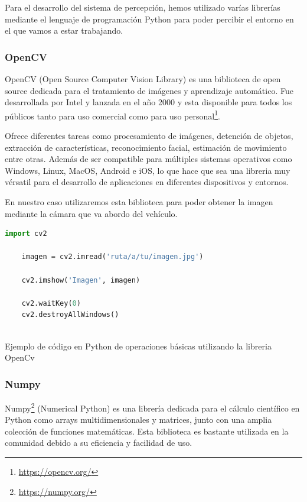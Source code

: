 Para el desarrollo del sistema de percepción, hemos utilizado varías librerías mediante el lenguaje de programación Python para poder
percibir el entorno en el que vamos a estar trabajando. 
\subsubsection{OpenCV}
\label{sec:OpenCV}
OpenCV (Open Source Computer Vision Library) es una biblioteca de open source dedicada para el tratamiento de imágenes y aprendizaje automático. Fue desarrollada por Intel y lanzada en 
el año 2000 y esta disponible para todos los públicos tanto para uso comercial como para uso personal\footnote{\url{https://opencv.org/}}.  \newline

Ofrece diferentes tareas como procesamiento de imágenes, detención de objetos, extracción de características, reconocimiento facial, estimación de movimiento entre otras. Además de ser
compatible para múltiples sistemas operativos como Windows, Linux, MacOS, Android e iOS, lo que hace que sea una libreria muy vérsatil para el desarrollo de aplicaciones en diferentes
dispositivos y entornos. \newline

En nuestro caso utilizaremos esta biblioteca para poder obtener la imagen mediante la cámara que va abordo del vehículo.

\begin{code}[h]
  \begin{lstlisting}[language=Python]
    import cv2

    imagen = cv2.imread('ruta/a/tu/imagen.jpg')
    
    cv2.imshow('Imagen', imagen)
    
    cv2.waitKey(0)
    cv2.destroyAllWindows()
    
  \end{lstlisting}
  \caption[Ejemplo de código en Python de operaciones básicas utilizando la libreria OpenCv]{Ejemplo de código en Python de operaciones básicas utilizando la libreria OpenCv}
  \label{cod:Numpy}
  \end{code}  

\subsubsection{Numpy}
\label{sec:Numpy}

Numpy\footnote{\url{https://numpy.org/}} (Numerical Python) es una librería dedicada para el cálculo científico en Python como arrays multidimensionales y matrices, junto con una amplia
colección de funciones matemáticas. Esta biblioteca es bastante utilizada en la comunidad debido a su eficiencia y facilidad de uso. 

